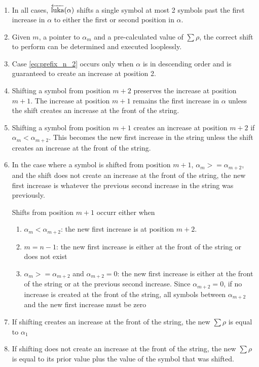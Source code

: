 \begin{enumerate}
    \item In all cases, $\overleftarrow{\text{luka}}(\alpha)$ shifts a single symbol at most 2 symbols past the first increase in $\alpha$ to either the first or second position in $\alpha$.  
    \item Given $m$, a pointer to $\alpha_m$ and a pre-calculated value of $\sum{\rho}$, the correct shift to perform can be determined and executed looplessly.
    \item Case \ref{eq:prefix_n_2} occurs only when $\alpha$ is in descending order and is guaranteed to create an increase at position 2.

    \item Shifting a symbol from position $m+2$ preserves the increase at position $m+1$.  The increase at position $m+1$ remains the first increase in $\alpha$ unless the shift creates an increase at the front of the string.

    \item Shifting a symbol from position $m+1$ creates an increase at position $m+2$ if $\alpha_m < \alpha_{m+2}$.  This becomes the new first increase in the string unless the shift creates an increase at the front of the string.

    \item In the case where a symbol is shifted from position $m+1$, $\alpha_m >= \alpha_{m+2}$, and the shift does not create an increase at the front of the string, the new first increase is whatever the previous second increase in the string was previously.

Shifts from position $m+1$ occurr either when 
        \begin{enumerate}
            \item $\alpha_m < \alpha_{m+2}$: the new first increase is at position $m+2$.
            \item $m=n-1$: the new first increase is either at the front of the string or does not exist
            \item $\alpha_m >= \alpha_{m+2}$ and $\alpha_{m+2} = 0$: the new first increase is either at the front of the string or at the previous second increase.  Since $\alpha_{m+2}=0$, if no increase is created at the front of the string, all symbols between $\alpha_{m+2}$ and the new first increase must be zero
        \end{enumerate}
    \item If shifting creates an increase at the front of the string, the new $\sum{\rho}$ is equal to $\alpha_1$
    \item If shifting does not create an increase at the front of the string, the new $\sum{\rho}$ is equal to its prior value plus the value of the symbol that was shifted.
         
\end{enumerate}


